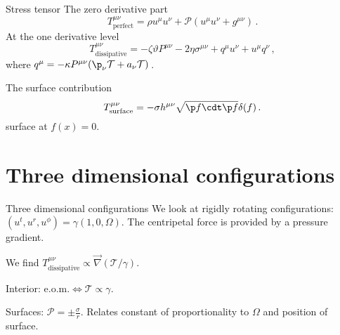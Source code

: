 \documentclass{beamer}
\newcommand{\tloc}{\mathcal{T}}
\newcommand{\ploc}{\mathcal{P}}
\begin{document}

\begin{frame}{Stress tensor}
%
 The zero derivative part
 \begin{equation*}
   T^{\mu\nu}_\mathrm{perfect} = \rho u^\mu u^\nu + \ploc (u^\mu u^\nu + g^{\mu\nu})\,.
 \end{equation*}
  At the one derivative level
 \begin{equation*}
   T^{\mu\nu}_\mathrm{dissipative} = -\zeta \vartheta P^{\mu\nu} -
   2\eta\sigma^{\mu\nu} + q^\mu u^\nu + u^\mu q^\nu\,,
 \end{equation*}
 \hfill where $  q^\mu = -\kappa P^{\mu\nu} (\p_\nu\tloc + a_\nu\tloc)$\,.

 The surface contribution
 \begin{equation*}
   T^{\mu\nu}_\mathrm{surface} = -\sigma h^{\mu\nu}
                       \sqrt{\p f\cdt\p f}\delta(f)\,.
 \end{equation*}
 \hfill surface at $f(x)=0$.
%
\end{frame}


\section{Three dimensional configurations}

\begin{frame}{Three dimensional configurations}
%
 We look at rigidly rotating configurations: $(u^t,u^r,u^\phi)=\gamma(1,0,\Omega)$. The centripetal force is provided by a pressure gradient.

 \vp We find $T^{\mu\nu}_\mathrm{dissipative} \propto \vec{\nabla}(\tloc/\gamma)$.

 \vp Interior: e.o.m.$\Leftrightarrow \tloc \propto \gamma$.

 \vp Surfaces: $\ploc = \pm\frac{\sigma}{r}$. Relates constant of proportionality to $\Omega$ and position of surface.
%
\end{frame}

\end{document}
